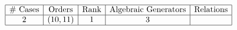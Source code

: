 \begin{table}[h]
	\centering
	$\begin{array}{|c|c|c|c|c|}
		\hline
		\text{\# Cases} & \text{Orders} & \text{Rank} & \text{Algebraic Generators} & \text{Relations} \\
		\hline
		2 & (10, 11) & 1 & 3 &  \\
		\hline
	\end{array}$
\end{table}
